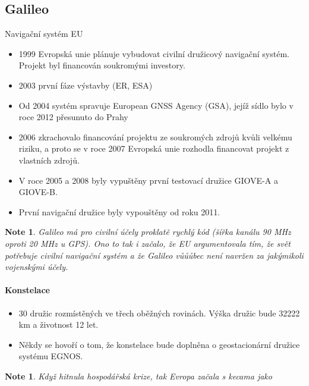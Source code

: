 \documentclass[11pt,a4paper]{article}
\theoremstyle{my-theorem}
\theoremstyle{non-theorem}
\newtheorem{note}[theorem]{Note}
\begin{document}
\subsection{Galileo}
Navigační systém EU
\begin{itemize}
    \item 1999 Evropská unie plánuje vybudovat civilní družicový navigační systém. Projekt byl financován soukromými investory.
    \item 2003 první fáze výstavby (ER, ESA)
    \item Od 2004 systém spravuje European GNSS Agency (GSA), jejíž sídlo bylo v roce 2012 přesunuto do Prahy
    \item 2006 zkrachovalo financování projektu ze soukromých zdrojů kvůli velkému riziku, a proto se v roce 2007 Evropská unie rozhodla financovat projekt z vlastních zdrojů.
    \item V roce 2005 a 2008 byly vypuštěny první testovací družice GIOVE-A a GIOVE-B.
    \item První navigační družice byly vypouštěny od roku 2011.
\end{itemize}
\begin{note}
    Galileo má pro civilní účely proklatě rychlý kód (šířka kanálu 90 MHz oproti 20 MHz u GPS). Ono to tak i začalo, že EU argumentovala tím, že svět potřebuje civilní navigační systém a že Galileo vůůůbec není navržen za jakýmikoli vojenskými účely.
\end{note}

\paragraph*{Konstelace}
\begin{itemize}
    \item 30 družic rozmístěných ve třech oběžných rovinách. Výška družic bude 32222 km a životnost 12 let.
    \item Někdy se hovoří o tom, že konstelace bude doplněna o geostacionární družice systému EGNOS.
\end{itemize}
\begin{note}
    Když hitnula hospodářská krize, tak Evropa začala s kecama jako 
\end{note}
\end{document}
